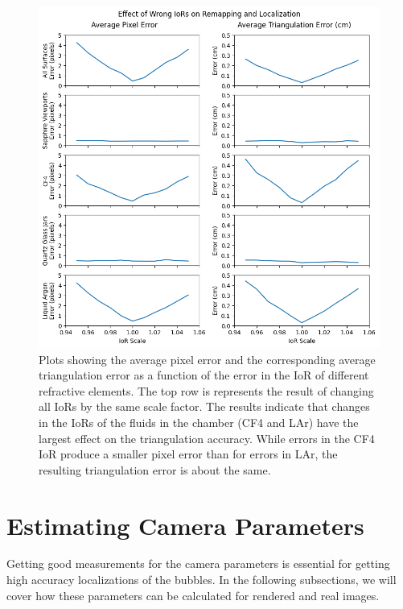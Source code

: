 \documentclass[11pt, letterpaper]{extarticle} %
\begin{document}
\begin{figure}[h]
    \centering
    \includegraphics[width=\textwidth]{effect_of_wrong_iors_on_remapping_and_localization.png}
    \caption{Plots showing the average pixel error and the corresponding average triangulation error as a function of the error in the IoR of different refractive elements. The top row is represents the result of changing all IoRs by the same scale factor. The results indicate that changes in the IoRs of the fluids in the chamber (CF4 and LAr) have the largest effect on the triangulation accuracy. While errors in the CF4 IoR produce a smaller pixel error than for errors in LAr, the resulting triangulation error is about the same.}
    \label{fig:effect_of_wrong_iors_on_remapping_and_localization}
\end{figure}

\section{Estimating Camera Parameters} \label{sec:estimating_camera_parameters}
Getting good measurements for the camera parameters is essential for getting high accuracy localizations of the bubbles. In the following subsections, we will cover how these parameters can be calculated for rendered and real images.
\end{document}
